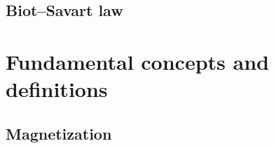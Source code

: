 \subsection{Biot--Savart law}

\section{Fundamental concepts and definitions}

\subsection{Magnetization}

